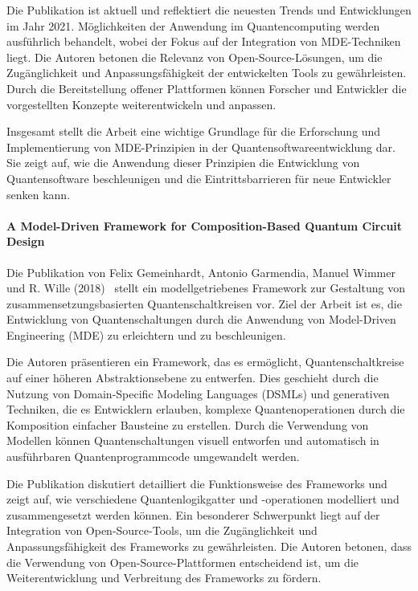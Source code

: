 Die Publikation ist aktuell und reflektiert die neuesten Trends und Entwicklungen im Jahr 2021. Möglichkeiten der Anwendung 
im Quantencomputing werden ausführlich behandelt, wobei der Fokus auf der Integration von MDE-Techniken liegt. 
Die Autoren betonen die Relevanz von Open-Source-Lösungen, um die Zugänglichkeit und Anpassungsfähigkeit der 
entwickelten Tools zu gewährleisten. Durch die Bereitstellung offener Plattformen können Forscher und Entwickler 
die vorgestellten Konzepte weiterentwickeln und anpassen.

Insgesamt stellt die Arbeit eine wichtige Grundlage für die Erforschung und Implementierung von MDE-Prinzipien 
in der Quantensoftwareentwicklung dar. Sie zeigt auf, wie die Anwendung dieser Prinzipien die Entwicklung von 
Quantensoftware beschleunigen und die Eintrittsbarrieren für neue Entwickler senken kann.

\paragraph{A Model-Driven Framework for Composition-Based Quantum Circuit Design}

Die Publikation von Felix Gemeinhardt, Antonio Garmendia, Manuel Wimmer und R. Wille (2018)~\cite{Gemeinhardt_2018}
stellt ein modellgetriebenes Framework zur Gestaltung von zusammensetzungsbasierten Quantenschaltkreisen vor. Ziel der Arbeit 
ist es, die Entwicklung von Quantenschaltungen durch die Anwendung von Model-Driven Engineering (MDE) zu erleichtern und zu beschleunigen.

Die Autoren präsentieren ein Framework, das es ermöglicht, Quantenschaltkreise auf einer höheren Abstraktionsebene zu entwerfen. 
Dies geschieht durch die Nutzung von Domain-Specific Modeling Languages (DSMLs) und generativen Techniken, die 
es Entwicklern erlauben, komplexe Quantenoperationen durch die Komposition einfacher Bausteine zu erstellen. 
Durch die Verwendung von Modellen können Quantenschaltungen visuell entworfen und automatisch in ausführbaren Quantenprogrammcode umgewandelt werden.

Die Publikation diskutiert detailliert die Funktionsweise des Frameworks und zeigt auf, wie verschiedene 
Quantenlogikgatter und -operationen modelliert und zusammengesetzt werden können. Ein besonderer Schwerpunkt liegt auf 
der Integration von Open-Source-Tools, um die Zugänglichkeit und Anpassungsfähigkeit des Frameworks zu gewährleisten. 
Die Autoren betonen, dass die Verwendung von Open-Source-Plattformen entscheidend ist, um die Weiterentwicklung und Verbreitung des Frameworks zu fördern.

